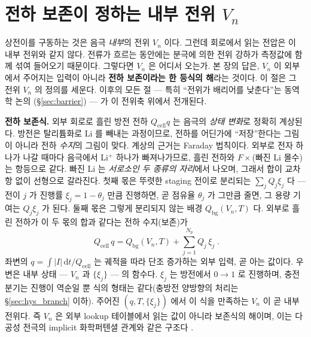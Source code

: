 \documentclass[11pt,a4paper]{article}
\newcommand{\dd}{\mathrm{d}}
\newcommand{\cell}{\mathrm{cell}}
\newcommand{\bg}{\mathrm{bg}}
\begin{document}
\section{전하 보존이 정하는 내부 전위 $V_n$}\label{sec:stage}
상전이를 구동하는 것은 음극 \emph{내부}의 전위 $V_n$ 이다. 그런데 회로에서 읽는 전압은 이 내부 전위와 같지
않다. 전류가 흐르는 동안에는 분극에 의한 전위 강하가 측정값에 함께 섞여 들어오기 때문이다. 그렇다면 $V_n$ 은
어디서 오는가. 본 장의 답은, $V_n$ 이 외부에서 주어지는 입력이 아니라 \textbf{전하 보존이라는 한 등식의 해}라는
것이다. 이 절은 그 전위 $V_n$ 의 정의를 세운다. 이후의 모든 절 — 특히 ``전위가 배리어를 낮춘다''는 동역학 논의
(\S\ref{sec:barrier}) — 가 이 전위축 위에서 전개된다.

\textbf{전하 보존식.} 외부 회로로 흘린 방전 전하 $Q_\cell q$ 는 음극의 \emph{상태 변화}로 정확히 계상된다.
방전은 탈리튬화로 Li 를 빼내는 과정이므로, 전하를 어딘가에 ``저장''한다는 그림이 아니라 전하 \emph{수지}의 그림이
맞다. 계상의 근거는 Faraday 법칙이다. 외부로 전자 하나가 나갈 때마다 음극에서 Li$^+$ 하나가 빠져나가므로, 흘린
전하와 $F\times$(빠진 Li 몰수)는 항등으로 같다. 빠진 Li 는 \emph{서로소인 두 종류의 자리}에서 나오며, 그래서
합이 교차항 없이 선형으로 갈라진다. 첫째 몫은 뚜렷한 staging 전이로 분리되는 $\sum_j Q_j\xi_j$ 다 — 전이 $j$ 가
진행률 $\xi_j=1-\theta_j$ 만큼 진행하면, 곧 점유율 $\theta_j$ 가 그만큼 줄면, 그 용량 기여는 $Q_j\xi_j$ 가 된다.
둘째 몫은 그렇게 분리되지 않는 배경 $Q_\bg(V_n,T)$ 다. 외부로 흘린 전하가 이 두 몫의 합과 같다는 전하 수지(보존)가
\begin{equation}
\boxed{\;Q_\cell\,q=Q_\bg(V_n,T)+\sum_{j=1}^{N_p}Q_j\,\xi_j\;.}
\label{eq:charge}
\end{equation}
좌변의 $q=\int|I|\,\dd t/Q_\cell$ 는 궤적을 따라 단조 증가하는 외부 입력, 곧 아는 값이다. 우변은 내부 상태 —
$V_n$ 과 $\{\xi_j\}$ — 의 함수다. $\xi_j$ 는 방전에서 $0\to1$ 로 진행하며, 충전 분기는 진행이 역순일 뿐 식의
형태는 같다(충방전 양방향의 처리는 \S\ref{sec:hys_branch} 이하). 주어진 $(q,T,\{\xi_j\})$ 에서 이 식을 만족하는
$V_n$ 이 곧 내부 전위다. 즉 $V_n$ 은 외부 lookup 테이블에서 읽는 값이 아니라 보존식의 해이며, 이는 다공성 전극의
implicit 화학퍼텐셜 관계와 같은 구조다 \cite{mckinnon1983,newman2004}.
\end{document}
